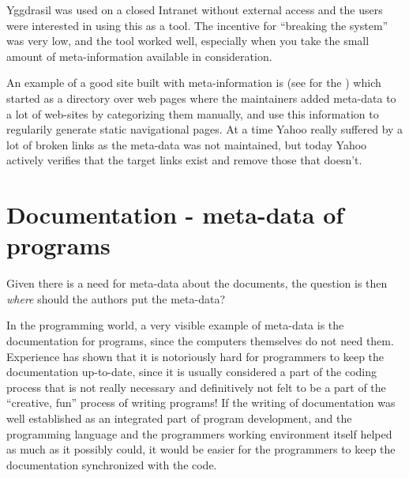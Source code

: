 Yggdrasil was used on a closed Intranet without external
access and the users were interested in using this as a
tool.  The incentive for ``breaking the system'' was very
low, and the tool worked well, especially when you take the
small amount of meta-information available in consideration.



An example of a good site built with meta-information is
 (see  for the
) which started as a
directory over web pages where the maintainers added meta-data to a
lot of web-sites by categorizing them manually, and use this
information to regularily generate static navigational pages.  At a
time Yahoo really suffered by a lot of broken links as the meta-data
was not maintained, but today Yahoo actively verifies that the target
links exist and remove those that doesn't.


\section{Documentation - meta-data of programs}


Given there is a need for meta-data about the documents, the question
is then \textit{where} should the authors put the meta-data?


In the programming world, a very visible example of meta-data is the
documentation for programs, since the computers themselves do not need
them.  Experience has shown that it is notoriously hard for
programmers to keep the documentation up-to-date, since it is usually
considered a part of the coding process that is not really necessary
and definitively not felt to be a part of the ``creative, fun''
process of writing programs!  If the writing of documentation was well
established as an integrated part of program development, and the
programming language and the programmers working environment itself
helped as much as it possibly could, it would be easier for the
programmers to keep the documentation synchronized with the code.

